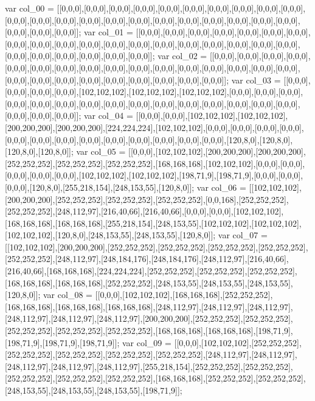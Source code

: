 var col_00 = [[0,0,0],[0,0,0],[0,0,0],[0,0,0],[0,0,0],[0,0,0],[0,0,0],[0,0,0],[0,0,0],[0,0,0],[0,0,0],[0,0,0],[0,0,0],[0,0,0],[0,0,0],[0,0,0],[0,0,0],[0,0,0],[0,0,0],[0,0,0],[0,0,0],[0,0,0],[0,0,0],[0,0,0],[0,0,0]];
var col_01 = [[0,0,0],[0,0,0],[0,0,0],[0,0,0],[0,0,0],[0,0,0],[0,0,0],[0,0,0],[0,0,0],[0,0,0],[0,0,0],[0,0,0],[0,0,0],[0,0,0],[0,0,0],[0,0,0],[0,0,0],[0,0,0],[0,0,0],[0,0,0],[0,0,0],[0,0,0],[0,0,0],[0,0,0],[0,0,0]];
var col_02 = [[0,0,0],[0,0,0],[0,0,0],[0,0,0],[0,0,0],[0,0,0],[0,0,0],[0,0,0],[0,0,0],[0,0,0],[0,0,0],[0,0,0],[0,0,0],[0,0,0],[0,0,0],[0,0,0],[0,0,0],[0,0,0],[0,0,0],[0,0,0],[0,0,0],[0,0,0],[0,0,0],[0,0,0],[0,0,0]];
var col_03 = [[0,0,0],[0,0,0],[0,0,0],[0,0,0],[102,102,102],[102,102,102],[102,102,102],[0,0,0],[0,0,0],[0,0,0],[0,0,0],[0,0,0],[0,0,0],[0,0,0],[0,0,0],[0,0,0],[0,0,0],[0,0,0],[0,0,0],[0,0,0],[0,0,0],[0,0,0],[0,0,0],[0,0,0],[0,0,0]];
var col_04 = [[0,0,0],[0,0,0],[102,102,102],[102,102,102],[200,200,200],[200,200,200],[224,224,224],[102,102,102],[0,0,0],[0,0,0],[0,0,0],[0,0,0],[0,0,0],[0,0,0],[0,0,0],[0,0,0],[0,0,0],[0,0,0],[0,0,0],[0,0,0],[0,0,0],[120,8,0],[120,8,0],[120,8,0],[120,8,0]];
var col_05 = [[0,0,0],[102,102,102],[200,200,200],[200,200,200],[252,252,252],[252,252,252],[252,252,252],[168,168,168],[102,102,102],[0,0,0],[0,0,0],[0,0,0],[0,0,0],[0,0,0],[102,102,102],[102,102,102],[198,71,9],[198,71,9],[0,0,0],[0,0,0],[0,0,0],[120,8,0],[255,218,154],[248,153,55],[120,8,0]];
var col_06 = [[102,102,102],[200,200,200],[252,252,252],[252,252,252],[252,252,252],[0,0,168],[252,252,252],[252,252,252],[248,112,97],[216,40,66],[216,40,66],[0,0,0],[0,0,0],[102,102,102],[168,168,168],[168,168,168],[255,218,154],[248,153,55],[102,102,102],[102,102,102],[102,102,102],[120,8,0],[248,153,55],[248,153,55],[120,8,0]];
var col_07 = [[102,102,102],[200,200,200],[252,252,252],[252,252,252],[252,252,252],[252,252,252],[252,252,252],[248,112,97],[248,184,176],[248,184,176],[248,112,97],[216,40,66],[216,40,66],[168,168,168],[224,224,224],[252,252,252],[252,252,252],[252,252,252],[168,168,168],[168,168,168],[252,252,252],[248,153,55],[248,153,55],[248,153,55],[120,8,0]];
var col_08 = [[0,0,0],[102,102,102],[168,168,168],[252,252,252],[168,168,168],[168,168,168],[168,168,168],[248,112,97],[248,112,97],[248,112,97],[248,112,97],[248,112,97],[248,112,97],[200,200,200],[252,252,252],[252,252,252],[252,252,252],[252,252,252],[252,252,252],[168,168,168],[168,168,168],[198,71,9],[198,71,9],[198,71,9],[198,71,9]];
var col_09 = [[0,0,0],[102,102,102],[252,252,252],[252,252,252],[252,252,252],[252,252,252],[252,252,252],[248,112,97],[248,112,97],[248,112,97],[248,112,97],[248,112,97],[255,218,154],[252,252,252],[252,252,252],[252,252,252],[252,252,252],[252,252,252],[168,168,168],[252,252,252],[252,252,252],[248,153,55],[248,153,55],[248,153,55],[198,71,9]];
